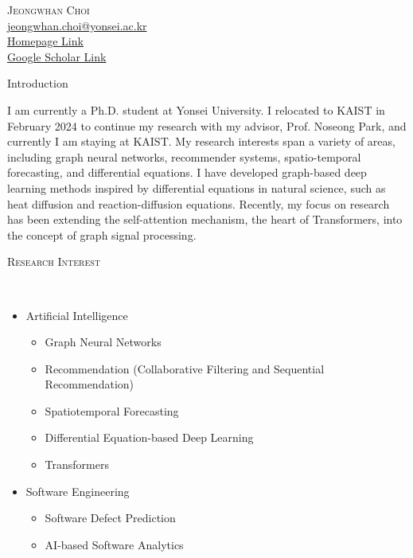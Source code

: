 \documentclass[10pt]{article}
\newenvironment{changemargin}[2]{
  \begin{list}{}{
    \setlength{\topsep}{0pt}
    \setlength{\leftmargin}{#1}
    \setlength{\rightmargin}{#2}
    \setlength{\listparindent}{\parindent}
    \setlength{\itemindent}{\parindent}
    \setlength{\parsep}{\parskip}
  }
  \item[]}{\end{list}
}
\newcommand{\lineover}{
	\begin{changemargin}{-0.05in}{-0.05in}
		\vspace*{-8pt}
		\hrulefill \\
		\vspace*{-2pt}
	\end{changemargin}
}
\newcommand{\header}[1]{
	\begin{changemargin}{-0.5in}{-0.5in}
		\scshape{#1}\\
  	\lineover
	\end{changemargin}
}
\newcommand{\contact}[5]{
	\begin{changemargin}{-0.5in}{-0.5in}
		\begin{center}
			{\Large \scshape {#1}}\\
      {#2} \\  {#3} \\ {#4} \\ {#5}
		\end{center}
	\end{changemargin}
}
\newenvironment{body} {
	\vspace*{-16pt}
	\begin{changemargin}{-0.25in}{-0.5in}
  }
	{\end{changemargin}
}
\begin{document}

\vspace{10pt}

\contact{Jeongwhan Choi}{\href{mailto:email@address.com}{jeongwhan.choi@yonsei.ac.kr}}{\href{https://jeongwhanchoi.me}{Homepage Link}}{\href{https://scholar.google.com/citations?user=3MNElkYAAAAJ&hl=en}{Google Scholar Link}}

\header{Introduction}
\begin{body}
    \vspace{14pt}
    I am currently a Ph.D. student at Yonsei University. I relocated to KAIST in February 2024 to continue my research with my advisor, Prof. Noseong Park, and currently I am staying at KAIST. My research interests span a variety of areas, including graph neural networks, recommender systems, spatio-temporal forecasting, and differential equations. I have developed graph-based deep learning methods inspired by differential equations in natural science, such as heat diffusion and reaction-diffusion equations. Recently, my focus on research has been extending the self-attention mechanism, the heart of Transformers, into the concept of graph signal processing.
\end{body}

\medskip

\header{Research Interest}

\begin{body}
    \vspace{14pt}
    \begin{itemize}
        \item Artificial Intelligence
        \begin{itemize}
            \item Graph Neural Networks
            \item Recommendation (Collaborative Filtering and Sequential Recommendation)
            \item Spatiotemporal Forecasting
            \item Differential Equation-based Deep Learning
            \item Transformers
        \end{itemize}
        \item Software Engineering
        \begin{itemize}
            \item Software Defect Prediction
            \item AI-based Software Analytics
        \end{itemize}
    \end{itemize}
\end{body}
\medskip
\end{document}
